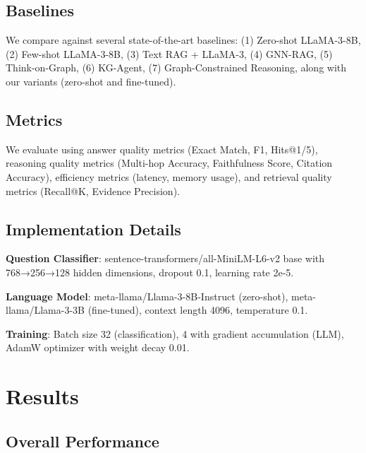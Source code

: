 \documentclass[conference]{IEEEtran}
\begin{document}
\subsection{Baselines}

We compare against several state-of-the-art baselines: (1) Zero-shot LLaMA-3-8B, (2) Few-shot LLaMA-3-8B, (3) Text RAG + LLaMA-3, (4) GNN-RAG, (5) Think-on-Graph, (6) KG-Agent, (7) Graph-Constrained Reasoning, along with our variants (zero-shot and fine-tuned).

\subsection{Metrics}

We evaluate using answer quality metrics (Exact Match, F1, Hits@1/5), reasoning quality metrics (Multi-hop Accuracy, Faithfulness Score, Citation Accuracy), efficiency metrics (latency, memory usage), and retrieval quality metrics (Recall@K, Evidence Precision).

\subsection{Implementation Details}

\textbf{Question Classifier}: sentence-transformers/all-MiniLM-L6-v2 base with 768→256→128 hidden dimensions, dropout 0.1, learning rate 2e-5.

\textbf{Language Model}: meta-llama/Llama-3-8B-Instruct (zero-shot), meta-llama/Llama-3-3B (fine-tuned), context length 4096, temperature 0.1.

\textbf{Training}: Batch size 32 (classification), 4 with gradient accumulation (LLM), AdamW optimizer with weight decay 0.01.

\section{Results}

\subsection{Overall Performance}
\end{document}
